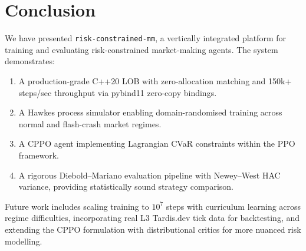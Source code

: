 \documentclass[11pt,twocolumn]{article}
\begin{document}
\section{Conclusion}\label{sec:conclusion}

We have presented \texttt{risk-constrained-mm}, a vertically integrated
platform for training and evaluating risk-constrained market-making
agents.  The system demonstrates:

\begin{enumerate}
  \item A production-grade C++20 LOB with zero-allocation matching and
  150k+ steps/sec throughput via pybind11 zero-copy bindings.
  \item A Hawkes process simulator enabling domain-randomised training
  across normal and flash-crash market regimes.
  \item A CPPO agent implementing Lagrangian CVaR constraints within
  the PPO framework.
  \item A rigorous Diebold--Mariano evaluation pipeline with
  Newey--West HAC variance, providing statistically sound strategy
  comparison.
\end{enumerate}

Future work includes scaling training to $10^7$ steps with curriculum
learning across regime difficulties, incorporating real L3 Tardis.dev
tick data for backtesting, and extending the CPPO formulation with
distributional critics for more nuanced risk modelling.
\end{document}

